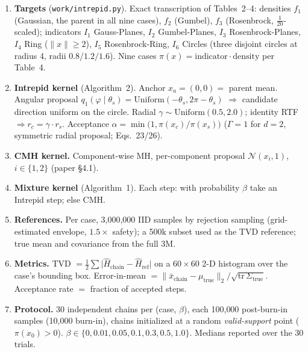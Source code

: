 \documentclass[11pt]{article}
\begin{document}
\begin{enumerate}[leftmargin=*]
\item \textbf{Targets} (\texttt{work/intrepid.py}). Exact transcription of
Tables~2--4: densities $f_1$ (Gaussian, the parent in all nine cases), $f_2$
(Gumbel), $f_3$ (Rosenbrock, $\tfrac{1}{20}$-scaled); indicators $I_1$
Gauss-Planes, $I_2$ Gumbel-Planes, $I_3$ Rosenbrock-Planes, $I_4$ Ring
($\lVert x\rVert \ge 2$), $I_5$ Rosenbrock-Ring, $I_6$ Circles (three disjoint
circles at radius 4, radii $0.8/1.2/1.6$). Nine cases
$\pi(x) = \text{indicator} \cdot \text{density}$ per Table~4.

\item \textbf{Intrepid kernel} (Algorithm~2). Anchor
$x_a = (0,0) =$ parent mean. Angular proposal
$q_1(\varphi \mid \theta_s) = \mathrm{Uniform}(-\theta_s, 2\pi-\theta_s)$
$\Rightarrow$ candidate direction uniform on the circle. Radial
$\gamma \sim \mathrm{Uniform}(0.5, 2.0)$; identity RTF $\Rightarrow r_c =
\gamma \cdot r_s$. Acceptance $\alpha = \min\bigl(1, \pi(x_c)/\pi(x_s)\bigr)$
($\Gamma{=}1$ for $d{=}2$, symmetric radial proposal; Eqs.\ 23/26).

\item \textbf{CMH kernel.} Component-wise MH, per-component proposal
$\mathcal{N}(x_i, 1)$, $i \in \{1,2\}$ (paper \S4.1).

\item \textbf{Mixture kernel} (Algorithm~1). Each step: with probability
$\beta$ take an Intrepid step; else CMH.

\item \textbf{References.} Per case, 3{,}000{,}000 IID samples by
rejection sampling (grid-estimated envelope, $1.5\times$ safety); a 500k
subset used as the TVD reference; true mean and covariance from the full 3M.

\item \textbf{Metrics.} TVD $= \tfrac{1}{2}\sum \lvert \hat H_{\text{chain}}
- \hat H_{\text{ref}} \rvert$ on a $60 \times 60$ 2-D histogram over the
case's bounding box. Error-in-mean
$= \lVert \bar x_{\text{chain}} - \mu_{\text{true}}\rVert_2 /
\sqrt{\mathrm{tr}\,\Sigma_{\text{true}}}$. Acceptance rate $=$ fraction of
accepted steps.

\item \textbf{Protocol.} 30 independent chains per (case, $\beta$), each
100{,}000 post-burn-in samples (10{,}000 burn-in), chains initialized at a
random \emph{valid-support} point ($\pi(x_0) > 0$).
$\beta \in \{0, 0.01, 0.05, 0.1, 0.3, 0.5, 1.0\}$. Medians reported over the
30 trials.
\end{enumerate}
\end{document}
